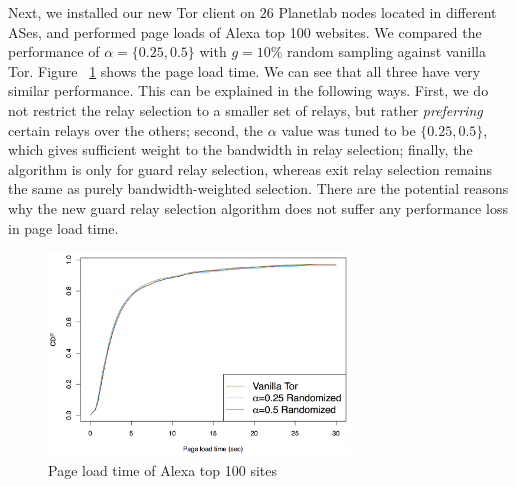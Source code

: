Next, we installed our new Tor client on $26$ Planetlab nodes located in different ASes, and performed page loads of Alexa top 100 websites. We compared the performance of $\alpha=\{0.25,0.5\}$ with $g=10\%$ random sampling against vanilla Tor. Figure ~\ref{fig_pageload} shows the page load time. We can see that all three have very similar performance. This can be explained in the following ways. First, we do not restrict the relay selection to a smaller set of relays, but rather \emph{preferring} certain relays over the others; second, the $\alpha$ value was tuned to be $\{0.25,0.5\}$, which gives sufficient weight to the bandwidth in relay selection; finally, the algorithm is only for guard relay selection, whereas exit relay selection remains the same as purely bandwidth-weighted selection. There are the potential reasons why the new guard relay selection algorithm does not suffer any performance loss in page load time. 

\begin{figure}[ht!]
\centering
\includegraphics[width=80mm]{figure/pageloadtime}
\caption{Page load time of Alexa top 100 sites \label{fig_pageload}}
\end{figure}



